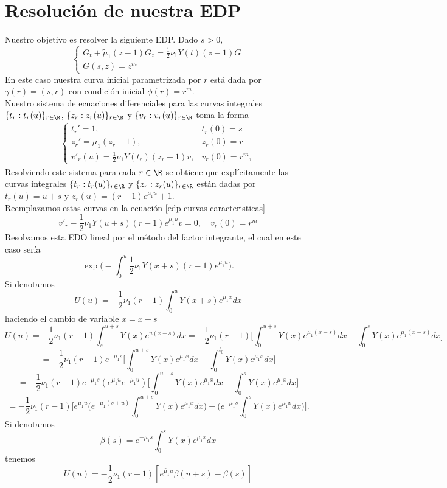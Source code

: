 \section{Resolución de nuestra EDP}
Nuestro objetivo es resolver la siguiente EDP. Dado $s>0,$
$$\begin{cases}
    G_t+\tilde{\mu}_1(z-1)G_z=\frac{1}{2}\nu_1Y(t)(z-1)G\\G(s,z)=z^m
\end{cases}$$
En este caso nuestra curva inicial parametrizada por $r$ está dada por $\gamma(r)=(s,r)$ con condición inicial $\phi(r)=r^m$.\\
Nuestro sistema de ecuaciones diferenciales para las curvas integrales $\{t_r:t_r(u)\}_{r\in\R}$, $\{z_r:z_r(u)\}_{r\in\R}$ y $\{v_r:v_r(u)\}_{r\in\R}$ toma la forma
\begin{eqnarray}
    \begin{cases}
    \label{edp-curvas-caracteristicas}
        t_r'=1, & t_r(0)=s\\
        z_r'=\mu_1(z_r-1), & z_r(0)=r\\
        v'_r(u)=\frac{1}{2}\nu_1Y(t_r)(z_r-1)v, & v_r(0)=r^m,
    \end{cases}
\end{eqnarray}
Resolviendo este sistema para cada $r\in\R$ se obtiene que explícitamente las curvas integrales $\{t_r:t_r(u)\}_{r\in\R}$ y $\{z_r:z_r(u)\}_{r\in\R}$ están dadas por $t_r(u)=u+s$ y $z_r(u)=(r-1)e^{\mu_1 u}+1$.\\
Reemplazamos estas curvas en la ecuación \ref{edp-curvas-caracteristicas}
$$v'_r-\frac{1}{2}\nu_1Y(u+s)(r-1)e^{\mu_1 u}v= 0, \quad v_r(0)=r^m$$
Resolvamos esta EDO lineal por el método del factor integrante, el cual en  este caso sería
$$\exp\bigg(-\int_0^u \frac{1}{2}\nu_1Y(x+s)(r-1)e^{\mu_1 u}\bigg).$$
Si denotamos
$$U(u)=-\frac{1}{2}\nu_1(r-1)\int_0^u Y(x+s)e^{\mu_1x} dx $$
haciendo el cambio de variable $x=x-s$
$$U(u)=-\frac{1}{2}\nu_1(r-1)\int_{s}^{u+s}Y(x)e^{u(x-s)}dx
=-\frac{1}{2}\nu_1(r-1)\bigg[\int_0^{u+s}Y(x)e^{\mu_1 (x-s)}dx-\int_0^{s}Y(x)e^{\mu_1 (x-s)}dx\bigg]$$
$$=-\frac{1}{2}\nu_1(r-1)e^{-\mu_1 s}\bigg[\int_0^{u+s}Y(x)e^{\mu_1 x}dx-\int_0^{t_0}Y(x)e^{\mu_1 x}dx\bigg]$$
$$=-\frac{1}{2}\nu_1(r-1)e^{-\mu_1 s}(e^{\mu_1 u}e^{-\mu_1 u})\bigg[\int_0^{u+s}Y(x)e^{\mu_1 x}dx-\int_0^{s}Y(x)e^{\mu_1 x}dx\bigg]$$
$$=-\frac{1}{2}\nu_1(r-1)\bigg[e^{\mu_1 u}\bigg(e^{-\mu_1 (s+u)}\int_0^{u+s}Y(x)e^{\mu_1 x}dx\bigg)-\bigg(e^{-\mu_1 s}\int_0^{s}Y(x)e^{\mu_1 x}dx\bigg)\bigg].$$
Si denotamos $$\beta(s)=e^{-\mu_1 s}\int_0^sY(x)e^{\mu_1 x}dx$$ tenemos 
$$U(u)=-\frac{1}{2}\nu_1(r-1)[e^{\tilde{\mu_1}u}\beta(u+s)-\beta(s)]$$

